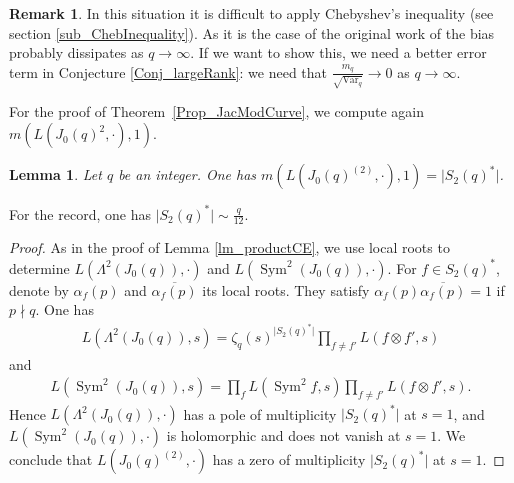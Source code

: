 \documentclass[a4paper,10pt]{amsart}
\theoremstyle{plain}
\newtheorem{lem}[theo]{Lemma}
\theoremstyle{definition}
\newtheorem{Rk}{Remark}
\begin{document}
\begin{Rk}
In this situation it is difficult to apply Chebyshev's inequality (see section \ref{sub_ChebInequality}).
As it is the case of the original work of \cite{RS} the bias probably dissipates as $q\rightarrow\infty$.
If we want to show this, we need a better error term in Conjecture \ref{Conj_largeRank}: we need that $\frac{m_{q}}{\sqrt{\operatorname{Var}_{q}}}\rightarrow 0$ as $q\rightarrow\infty$.
\end{Rk}

For the proof of Theorem~\ref{Prop_JacModCurve}, we compute again $m(L(J_{0}(q)^{2},\cdot),1)$. 
\begin{lem}\label{lm_L2Jac}
Let $q$ be an integer.
One has $m(L(J_{0}(q)^{(2)},\cdot),1)= \lvert S_{2}(q)^{*} \rvert $.
\end{lem}
For the record, one has $\lvert S_{2}(q)^{*} \rvert  \sim \frac{q}{12}$.

\begin{proof}
As in the proof of Lemma \ref{lm_productCE}, we use local roots to determine 
$L(\Lambda^{2}(J_{0}(q)),\cdot)$ and $L(\operatorname{Sym}^{2}(J_{0}(q)),\cdot)$.
For $f\in S_{2}(q)^{*}$, denote by $\alpha_{f}(p)$ and $\overline{\alpha_{f}(p)}$ its local roots.
They satisfy $\alpha_{f}(p)\overline{\alpha_{f}(p)}=1$ if $p\nmid q$.
One has
\begin{align*}
L(\Lambda^{2}(J_{0}(q)),s) = \zeta_{q}(s)^{\lvert S_{2}(q)^{*} \rvert}\prod_{f\neq f'}L(f\otimes f',s)
\end{align*}
and
\begin{align*}
L(\operatorname{Sym}^{2}(J_{0}(q)),s) = \prod_{f}L(\operatorname{Sym}^{2}f,s)\prod_{f\neq f'}L(f\otimes f',s).
\end{align*}
Hence $L(\Lambda^{2}(J_{0}(q)),\cdot)$ has a pole of multiplicity $\lvert S_{2}(q)^{*} \rvert$ at $s=1$,
and $L(\operatorname{Sym}^{2}(J_{0}(q)),\cdot)$ is holomorphic and does not vanish at $s=1$.
We conclude that $L(J_{0}(q)^{(2)},\cdot)$ has a zero of multiplicity $\lvert S_{2}(q)^{*} \rvert$ at $s=1$.
\end{proof}
\end{document}
